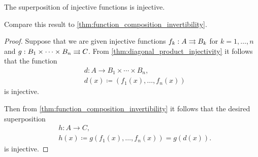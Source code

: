\begin{proposition}\label{thm:function_superposition_invertibility}
  The superposition of injective functions is injective.
\end{proposition}
\begin{comments}
  \item Compare this result to \cref{thm:function_composition_invertibility}.
\end{comments}
\begin{proof}
  Suppose that we are given injective functions \( f_k: A \rightrightarrows B_k \) for \( k = 1, \ldots, n \) and \( g: B_1 \times \cdots \times B_n \rightrightarrows C \). From \cref{thm:diagonal_product_injectivity} it follows that the function
  \begin{equation*}
    \begin{aligned}
      &d: A \to B_1 \times \cdots \times B_n, \\
      &d(x) \coloneqq (f_1(x), \ldots, f_n(x))
    \end{aligned}
  \end{equation*}
  is injective.

  Then from \cref{thm:function_composition_invertibility} it follows that the desired superposition
  \begin{equation*}
    \begin{aligned}
      &h: A \to C, \\
      &h(x) \coloneqq g(f_1(x), \ldots, f_n(x)) = g(d(x)).
    \end{aligned}
  \end{equation*}
  is injective.
\end{proof}

